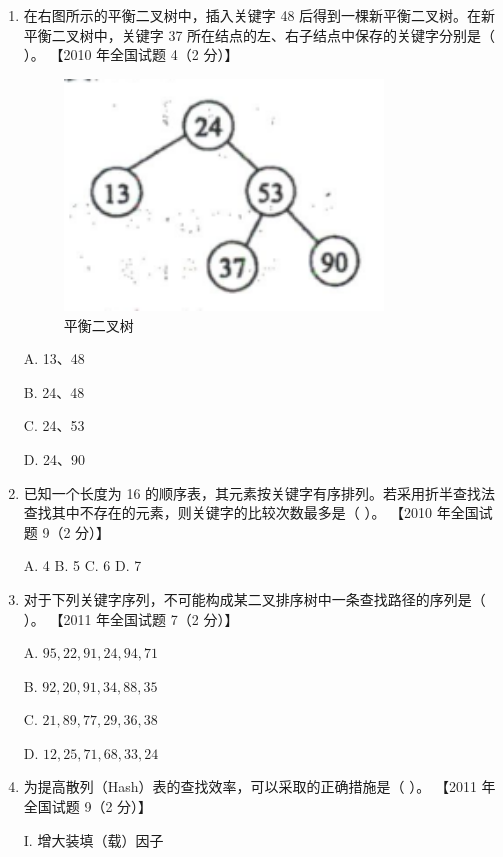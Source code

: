 \documentclass[lang=cn,newtx,10pt,scheme=chinese]{elegantbook}
\begin{document}
\begin{enumerate}
    \item 在右图所示的平衡二叉树中，插入关键字 48 后得到一棵新平衡二叉树。在新平衡二叉树中，关键字 37 所在结点的左、右子结点中保存的关键字分别是（ ）。  
    【2010 年全国试题 4（2 分）】

    \begin{figure}[h!]
        \centering
        \includegraphics[width=0.8\textwidth]{./figure/exercisePicPDF/chapter9/9-13.pdf}
        \caption{平衡二叉树}
    \end{figure}

    A. 13、48  

    B. 24、48  

    C. 24、53  

    D. 24、90  

    \item 已知一个长度为 16 的顺序表，其元素按关键字有序排列。若采用折半查找法查找其中不存在的元素，则关键字的比较次数最多是（ ）。  
    【2010 年全国试题 9（2 分）】  

    A. 4 \quad B. 5 \quad C. 6 \quad D. 7  

    \item 对于下列关键字序列，不可能构成某二叉排序树中一条查找路径的序列是（ ）。  
    【2011 年全国试题 7（2 分）】  

    A. $95, 22, 91, 24, 94, 71$ 

    B. $92, 20, 91, 34, 88, 35$  

    C. $21, 89, 77, 29, 36, 38$  

    D. $12, 25, 71, 68, 33, 24$  

    \item 为提高散列（Hash）表的查找效率，可以采取的正确措施是（ ）。  
    【2011 年全国试题 9（2 分）】  

    I. 增大装填（载）因子  


\end{enumerate}
\end{document}
